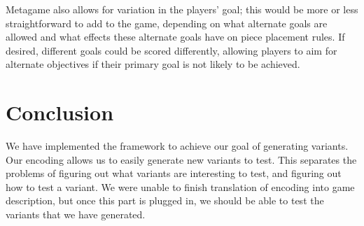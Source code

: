 \documentclass[11pt,letterpaper]{article}
\begin{document}
Metagame also allows for variation in the players' goal; this would be more or
less straightforward to add to the game, depending on what alternate goals are
allowed and what effects these alternate goals have on piece placement rules. If
desired, different goals could be scored differently, allowing players to aim
for alternate objectives if their primary goal is not likely to be achieved.

\section{Conclusion}
We have implemented the framework to achieve our goal of generating variants. Our encoding allows us to easily generate new variants to test. This separates the problems of figuring out what variants are interesting to test, and figuring out how to test a variant. We were unable to finish translation of encoding into game description, but once this part is plugged in, we should be able to test the variants that we have generated.

\printbibliography
\end{document}
